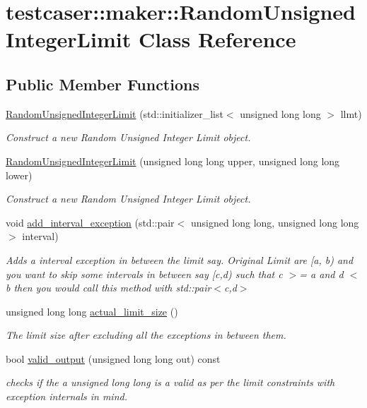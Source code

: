 \hypertarget{classtestcaser_1_1maker_1_1RandomUnsignedIntegerLimit}{}\section{testcaser\+:\+:maker\+:\+:Random\+Unsigned\+Integer\+Limit Class Reference}
\label{classtestcaser_1_1maker_1_1RandomUnsignedIntegerLimit}
\subsection*{Public Member Functions}
\begin{DoxyCompactItemize}
\item 
\mbox{\hyperlink{classtestcaser_1_1maker_1_1RandomUnsignedIntegerLimit_a8535b952828f59d17c69caae62f4c4e1}{Random\+Unsigned\+Integer\+Limit}} (std\+::initializer\+\_\+list$<$ unsigned long long $>$ llmt)
\begin{DoxyCompactList}\small\item\em Construct a new Random Unsigned Integer Limit object. \end{DoxyCompactList}\item 
\mbox{\hyperlink{classtestcaser_1_1maker_1_1RandomUnsignedIntegerLimit_a4299cc026c1ed26b595c248c6e243f8c}{Random\+Unsigned\+Integer\+Limit}} (unsigned long long upper, unsigned long long lower)
\begin{DoxyCompactList}\small\item\em Construct a new Random Unsigned Integer Limit object. \end{DoxyCompactList}\item 
void \mbox{\hyperlink{classtestcaser_1_1maker_1_1RandomUnsignedIntegerLimit_a979b5384118ab1f3c20366ae3e9bff7a}{add\+\_\+interval\+\_\+exception}} (std\+::pair$<$ unsigned long long, unsigned long long $>$ interval)
\begin{DoxyCompactList}\small\item\em Adds a interval exception in between the limit say. Original Limit are \mbox{[}a, b) and you want to skip some intervals in between say \mbox{[}c,d) such that c $>$= a and d $<$ b then you would call this method with std\+::pair$<$c,d$>$ \end{DoxyCompactList}\item 
unsigned long long \mbox{\hyperlink{classtestcaser_1_1maker_1_1RandomUnsignedIntegerLimit_a8235c0a24e918b66eafdfb4987d3258a}{actual\+\_\+limit\+\_\+size}} ()
\begin{DoxyCompactList}\small\item\em The limit size after excluding all the exceptions in between them. \end{DoxyCompactList}\item 
bool \mbox{\hyperlink{classtestcaser_1_1maker_1_1RandomUnsignedIntegerLimit_af38fd933b010cd1877e012ed40b2cafa}{valid\+\_\+output}} (unsigned long long out) const
\begin{DoxyCompactList}\small\item\em checks if the a unsigned long long is a valid as per the limit constraints with exception internals in mind. \end{DoxyCompactList}\end{DoxyCompactItemize}
